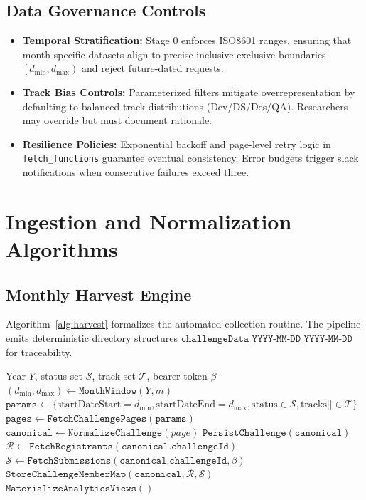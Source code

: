 \documentclass[11pt]{article}
\begin{document}
\subsection{Data Governance Controls}
\begin{itemize}[leftmargin=*]
  \item \textbf{Temporal Stratification:} Stage 0 enforces ISO8601 ranges, ensuring that month-specific datasets align to precise inclusive-exclusive boundaries $\left[d_{\min}, d_{\max}\right)$ and reject future-dated requests.
  \item \textbf{Track Bias Controls:} Parameterized filters mitigate overrepresentation by defaulting to balanced track distributions (Dev/DS/Des/QA). Researchers may override but must document rationale.
  \item \textbf{Resilience Policies:} Exponential backoff and page-level retry logic in \texttt{fetch\_functions} guarantee eventual consistency. Error budgets trigger slack notifications when consecutive failures exceed three.
\end{itemize}

\section{Ingestion and Normalization Algorithms}
\subsection{Monthly Harvest Engine}
Algorithm~\ref{alg:harvest} formalizes the automated collection routine. The pipeline emits deterministic directory structures \(\texttt{challengeData\_YYYY-MM-DD\_YYYY-MM-DD}\) for traceability.

\begin{algorithm}[h]
\caption{Monthly Challenge Harvest}
\label{alg:harvest}
\begin{algorithmic}[1]
\Require Year $Y$, status set $\mathcal{S}$, track set $\mathcal{T}$, bearer token $\beta$
  \State $(d_{\min}, d_{\max}) \gets \texttt{MonthWindow}(Y, m)$
  \State $\texttt{params} \gets \{ \text{startDateStart}=d_{\min}, \text{startDateEnd}=d_{\max}, \text{status}\in\mathcal{S}, \text{tracks[]}\in\mathcal{T}\}$
  \State $\texttt{pages} \gets \texttt{FetchChallengePages}(\texttt{params})$
    \State $\texttt{canonical} \gets \texttt{NormalizeChallenge}(page)$
    \State $\texttt{PersistChallenge}(\texttt{canonical})$
    \State $\mathcal{R} \gets \texttt{FetchRegistrants}(\texttt{canonical.challengeId})$
    \State $\mathcal{S} \gets \texttt{FetchSubmissions}(\texttt{canonical.challengeId}, \beta)$
    \State $\texttt{StoreChallengeMemberMap}(\texttt{canonical}, \mathcal{R}, \mathcal{S})$
  \EndFor
\EndFor
\State \Return $\texttt{MaterializeAnalyticsViews}()$
\end{algorithmic}
\end{algorithm}
\end{document}
